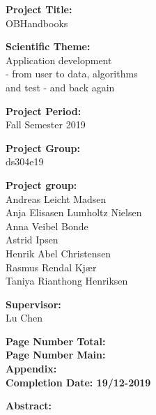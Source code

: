 \begin{minipage}[t]{0.48\textwidth}
\textbf{Project Title:} \\[5pt]\hspace*{2ex}
OBHandbooks


\textbf{Scientific Theme:} \\[5pt]\hspace{2ex}
Application development\\ - from user to data, algorithms\\ and test - and back again

\textbf{Project Period:} \\[5pt]\bigskip\hspace{2ex}
Fall Semester 2019

\textbf{Project Group:} \\[5pt]\bigskip\hspace{2ex}
ds304e19

\textbf{Project group:} \\[5pt]\hspace*{2ex}
Andreas Leicht Madsen \\\hspace*{2ex}
Anja Elisasen Lumholtz Nielsen \\\hspace*{2ex}
Anna Veibel Bonde \\\hspace*{2ex}
Astrid Ipsen \\\hspace*{2ex}
Henrik Abel Christensen \\\hspace*{2ex}
Rasmus Rendal Kjær \\\hspace*{2ex}
Taniya Rianthong Henriksen \\\hspace*{2ex}

\textbf{Supervisor:} \\[5pt]\hspace*{2ex}
Lu Chen \\\hspace*{2ex}

\vspace*{1cm}

\textbf{Page Number Total: \color{red}{???}}\\
\textbf{Page Number Main: \pageref{LastPage} }\\
\textbf{Appendix: \color{red}{???}} \\ 
\textbf{Completion Date: 19/12-2019}

\end{minipage}
\hfill
\begin{minipage}[t]{0.483\textwidth}
\textbf{Abstract:} \\[5pt]
\fbox{\parbox{8cm}{\bigskip\bigskip}}
\end{minipage}

